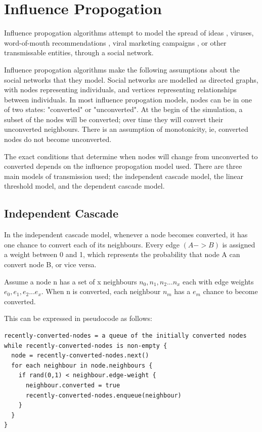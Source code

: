 \section{Influence Propogation}

 Influence propogation algorithms attempt to model the spread of ideas \cite{rogers}, viruses, word-of-mouth recommendations \cite{goldlimul}, viral marketing campaigns \cite{kempe}, or other transmissable entities, through a social network.

Influence propogation algorithms make the following assumptions about the social networks that they model. Social networks are modelled as directed graphs, with nodes representing individuals, and vertices representing relationships between individuals. In most influence propogation models, nodes can be in one of two states: "converted" or "unconverted". At the begin of the simulation, a subset of the nodes will be converted; over time they will convert their unconverted neighbours. There is an assumption of monotonicity, ie, converted nodes do not become unconverted.

 The exact conditions that determine when nodes will change from unconverted to converted depends on the influence propogation model used. There are three main models of transmission used; the independent cascade model, the linear threshold model, and the dependent cascade model.

\subsection{Independent Cascade}
 In the independent cascade model, whenever a node becomes converted, it has one chance to convert each of its neighbours. Every edge \((A -> B)\) is assigned a weight between 0 and 1, which represents the probability that node A can convert node B, or vice versa.

Assume a node n has a set of x neighbours \(n_0,n_1,n_2...n_x\) each with edge weights \(e_0,e_1,e_2...e_x\). When n is converted, each neighbour \(n_m\) has a \(e_m\) chance to become converted.

This can be expressed in pseudocode as follows:

\begin{verbatim}
recently-converted-nodes = a queue of the initially converted nodes
while recently-converted-nodes is non-empty {
  node = recently-converted-nodes.next()
  for each neighbour in node.neighbours {
    if rand(0,1) < neighbour.edge-weight {
      neighbour.converted = true
      recently-converted-nodes.enqueue(neighbour)
    }
  }
}
\end{verbatim}

